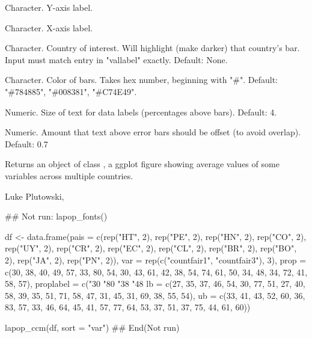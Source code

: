 \documentclass[a4paper]{book}
\begin{document}
\begin{Arguments}
\begin{ldescription}
\item[\code{y\_label}] Character.  Y-axis label.

\item[\code{x\_label}] Character.  X-axis label.

\item[\code{highlight}] Character.  Country of interest.  Will highlight (make darker) that country's bar.
Input must match entry in "vallabel" exactly. Default: None.

\item[\code{color\_scheme}] Character.  Color of bars.  Takes hex number, beginning with "\#".
Default: "\#784885", "\#008381", "\#C74E49".

\item[\code{label\_size}] Numeric.  Size of text for data labels (percentages above bars).  Default: 4.

\item[\code{text\_position}] Numeric.  Amount that text above error bars should be offset (to avoid overlap).  Default: 0.7
\end{ldescription}
\end{Arguments}
%
\begin{Value}
Returns an object of class , a ggplot figure showing
average values of some variables across multiple countries.
\end{Value}
%
\begin{Author}
Luke Plutowski, 
\end{Author}
%
\begin{Examples}
\begin{ExampleCode}
## Not run: 
lapop_fonts()

df <- data.frame(pais = c(rep("HT", 2), rep("PE", 2), rep("HN", 2), rep("CO", 2),
             rep("UY", 2), rep("CR", 2), rep("EC", 2), rep("CL", 2),
              rep("BR", 2), rep("BO", 2), rep("JA", 2), rep("PN", 2)),
              var = rep(c("countfair1", "countfair3"), 3),
              prop = c(30, 38, 40, 49, 57, 33, 80, 54, 30, 43, 61, 42,
                       38, 54, 74, 61, 50, 34, 48, 34, 72, 41, 58, 57),
              proplabel = c("30%
                            "80%
                            "38%
                            "48%
              lb = c(27, 35, 37, 46, 54, 30, 77, 51, 27, 40, 58, 39,
                     35, 51, 71, 58, 47, 31, 45, 31, 69, 38, 55, 54),
              ub = c(33, 41, 43, 52, 60, 36, 83, 57, 33, 46, 64, 45,
                     41, 57, 77, 64, 53, 37, 51, 37, 75, 44, 61, 60))

lapop_ccm(df, sort = "var")
## End(Not run)
\end{ExampleCode}
\end{Examples}
\end{document}
